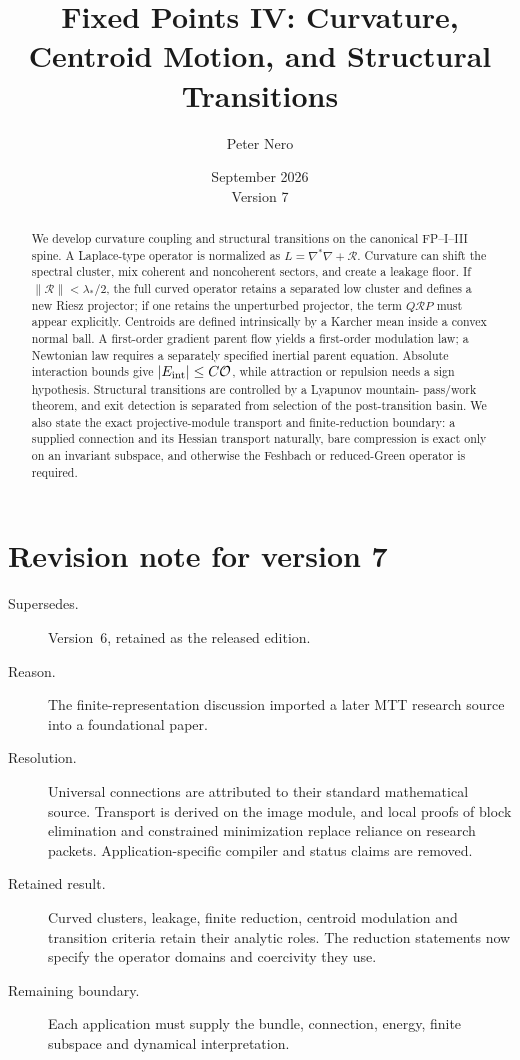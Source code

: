 \documentclass[11pt]{article}
\title{Fixed Points IV: Curvature, Centroid Motion, and Structural Transitions}
\author{Peter Nero}
\date{September 2026\\Version 7}
\begin{document}
\maketitle
\seriestagline

\begin{abstract}
We develop curvature coupling and structural transitions on the canonical
FP--I--III spine. A Laplace-type operator is normalized as
$L=\nabla^\ast\nabla+\mathcal R$. Curvature can shift the spectral cluster,
mix coherent and noncoherent sectors, and create a leakage floor. If
$\|\mathcal R\|<\lambda_\ast/2$, the full curved operator retains a separated
low cluster and defines a new Riesz projector; if one retains the unperturbed
projector, the term $Q\mathcal RP$ must appear explicitly. Centroids are defined
intrinsically by a Karcher mean inside a convex normal ball. A first-order
gradient parent flow yields a first-order modulation law; a Newtonian law
requires a separately specified inertial parent equation. Absolute interaction
bounds give $|E_{\rm int}|\le C\mathcal O$, while attraction or repulsion needs a
sign hypothesis. Structural transitions are controlled by a Lyapunov mountain-
pass/work theorem, and exit detection is separated from selection of the
post-transition basin. We also state the exact projective-module transport and
finite-reduction boundary: a supplied connection and its Hessian transport
naturally, bare compression is exact only on an invariant subspace, and
otherwise the Feshbach or reduced-Green operator is required.
\end{abstract}

\section*{Revision note for version 7}
\begin{description}
\item[Supersedes.] Version~6, retained as the released edition.
\item[Reason.] The finite-representation discussion imported a later MTT
research source into a foundational paper.
\item[Resolution.] Universal connections are attributed to their standard
mathematical source. Transport is derived on the image module, and local
proofs of block elimination and constrained minimization replace reliance on
research packets. Application-specific compiler and status claims are removed.
\item[Retained result.] Curved clusters, leakage, finite reduction, centroid
modulation and transition criteria retain their analytic roles. The reduction
statements now specify the operator domains and coercivity they use.
\item[Remaining boundary.] Each application must supply the bundle,
connection, energy, finite subspace and dynamical interpretation.
\end{description}
\end{document}
